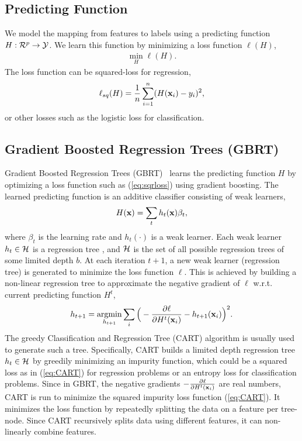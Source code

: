 \subsection{Predicting Function} We model the mapping from features to labels using a predicting function $H : {\cal R}^p \rightarrow {\cal Y}$. We learn this function by minimizing a loss function $\ell(H)$,
\begin{align}
	\min_H \ell(H). \label{eq:loss}
\end{align}
The loss function can be squared-loss for regression,
\begin{align}
	\ell_{sq}(H) = \frac{1}{n}\sum_{i=1}^n (H(\mathbf{x}_i) - y_i)^2, \label{eq:sqrloss}
\end{align}
or other losses such as the logistic loss for classification.

\subsection{Gradient Boosted Regression Trees (GBRT)} 
\label{sec:bg_gbrt}
Gradient Boosted Regression Trees (GBRT)~\citep{friedman2001greedy} learns the predicting function $H$ by optimizing a loss function such as (\ref{eq:sqrloss}) using gradient boosting. The learned predicting function is an additive classifier consisting of weak learners, 
\begin{align}
	H(\mathbf{x}) = \sum_t h_t(\mathbf{x}) \beta_t, \label{eq:H}
\end{align}
where $\beta_t$ is the learning rate and $h_t(\cdot)$ is a weak learner. Each weak learner $h_t \in {\cal H}$ is a regression tree \citep{breiman1984classification}, and ${\cal H}$ is the set of all possible regression trees of some limited depth $b$. At each iteration $t + 1$, a new weak learner (regression tree) is generated to minimize the loss function $\ell$. This is achieved by building a non-linear regression tree to approximate the negative gradient of $\ell$ w.r.t. current predicting function $H^t$,
\begin{align}
	h_{t+1} = \argmin_{h_{t+1}} \sum_i \Big( - \frac{\partial \ell}{\partial H^t(\x_i)} - h_{t+1}(\x_i)\Big)^2. \label{eq:CART}
\end{align}
The greedy Classification and Regression Tree (CART) algorithm \citep{breiman1984classification} is usually used to generate such a tree. Specifically, CART builds a limited depth regression tree $h_t \in {\cal H}$ by greedily minimizing an impurity function, which could be a squared loss as in (\ref{eq:CART}) for regression problems or an entropy loss for classification problems. Since in GBRT, the negative gradients $-\frac{\partial \ell}{\partial H^t(\mathbf{x}_i)}$ are real numbers, CART is run to minimize the squared impurity loss function (\ref{eq:CART}). It minimizes the loss function by repeatedly splitting the data on a feature per tree-node. Since CART recursively splits data using different features, it can non-linearly combine features.

